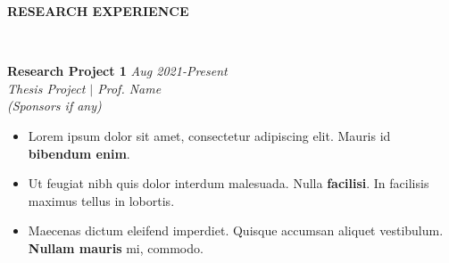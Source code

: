 \documentclass[9pt]{article}
\newenvironment{changemargin}[2]{%
  \begin{list}{}{%
    \setlength{\topsep}{0pt}%
    \setlength{\leftmargin}{#1}%
    \setlength{\rightmargin}{#2}%
    \setlength{\listparindent}{\parindent}%
    \setlength{\itemindent}{\parindent}%
    \setlength{\parsep}{\parskip}%
  }%
  \item[]}{\end{list}
}
\newcommand{\lineover}{
	\begin{changemargin}{-0.05in}{-0.05in}
		\vspace*{-8pt}
		\hrulefill \\
		\vspace*{-2pt}
	\end{changemargin}
}
\newcommand{\header}[1]{
	\begin{changemargin}{-0.7in}{-0.35in}
		\begin{large}
		\scshape{\textbf{#1}}\\
		\end{large}
  	\lineover
	\end{changemargin}
}
\newcommand{\jobdescription}[1]{
	\begin{changemargin}{0.05in}{0.05in}
    \smallskip
		{#1}
    \medskip
	\end{changemargin}
}
\newcommand{\jobtitle}[3]{
	\textbf{#1} \hfill \emph{#3}\\
	\emph{#2}
}
\newenvironment{body} {
	\vspace*{-16pt}
	\begin{changemargin}{-0.65in}{-0.5in}
  }	
	{\end{changemargin}
}
\begin{document}
\header{RESEARCH EXPERIENCE}
\begin{body}
	\vspace{14pt}
	
  \jobtitle{Research Project 1}{Thesis Project $|$ Prof. Name \\(Sponsors if any)}{Aug 2021-Present}
  \jobdescription{
  	\begin{itemize} \itemsep -0pt  %
  		\item Lorem ipsum dolor sit amet, consectetur adipiscing elit. Mauris id \textbf{bibendum enim}. 
  		\item Ut feugiat nibh quis dolor interdum malesuada. Nulla \textbf{facilisi}. In facilisis maximus tellus in lobortis.  
  \item Maecenas dictum eleifend imperdiet. Quisque accumsan aliquet vestibulum. \textbf{Nullam mauris} mi, commodo. 
  	\end{itemize}
  }
  

\end{body}
\end{document}
